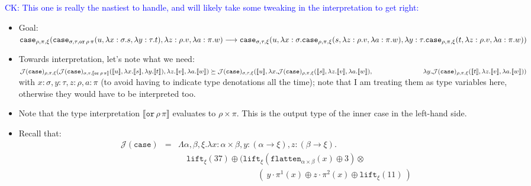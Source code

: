 \documentclass[runningheads,a4paper]{llncs}
\newcommand{\Termmap}{\mathcal{J}}
\newcommand{\typeinterpret}[1]{\llbracket #1 \rrbracket}
\newcommand{\interpret}[1]{\llbracket #1 \rrbracket}
\newcommand{\red}{\longrightarrow}
\newcommand{\arrtype}{\rightarrow}
\newcommand{\abs}[2]{\lambda #1.#2}
\newcommand{\flatten}{\mathtt{flatten}}
\newcommand{\lift}{\mathtt{lift}}
\newcommand{\CK}[1]{\textcolor{blue}{CK: #1}}
\begin{document}
\CK{This one is really the nastiest to handle, and will likely take
some tweaking in the interpretation to get right:}
\begin{itemize}
\item Goal: \\$
\mathtt{case}_{\rho,\pi,\xi}(\mathtt{case}_{\sigma,\tau,\mathtt{or}\,
  \rho\,\pi}(u,\abs{x:\sigma}{s},\abs{y:\tau}{t}),\abs{z:\rho}{v},\abs{a:\pi}{w}) \red \\
  \mathtt{case}_{\sigma,\tau,\xi}(u,
    \abs{x:\sigma}{\mathtt{case}_{\rho,\pi,\xi}(s,\abs{z:\rho}{v},\abs{a:\pi}{w})},
    \abs{y:\tau}{\mathtt{case}_{\rho,\pi,\xi}(t,\abs{z:\rho}{v},\abs{a:\pi}{w})})
$
\item Towards interpretation, let's note what we need: \\
  $\mathcal{J}(\mathtt{case})_{\rho,\pi,\xi}(
    \mathcal{J}(\mathtt{case})_{\sigma,\tau,\typeinterpret{\mathtt{or}\,
    \rho\,\pi}}(\interpret{u},\abs{x}{\interpret{s}},
    \abs{y}{\interpret{t}}),\abs{z}{\interpret{v}},
    \abs{a}{\interpret{w}}) \succeq \\
  \mathcal{J}(\mathtt{case})_{\sigma,\tau,\xi}(\interpret{u},
    \abs{x}{\mathcal{J}(\mathtt{case})_{\rho,\pi,\xi}(\interpret{s},
    \abs{z}{\interpret{v}},\abs{a}{\interpret{w}})},\\
    \phantom{ABCDEFGHIJ}
    \abs{y}{\mathcal{J}(\mathtt{case})_{\rho,\pi,\xi}(\interpret{t},
    \abs{z}{\interpret{v}},\abs{a}{\interpret{w}})})
$ \\
  with $x : \sigma,y:\tau,z:\rho,a:\pi$ (to avoid having to indicate
  type denotations all the time); note that I am treating them as type
  variables here, otherwise they would have to be interpreted too.
\item Note that the type interpretation $\typeinterpret{\mathtt{or}\,
  \rho\,\pi}$ evaluates to $\rho \times \pi$.  This is the output type
  of the inner case in the left-hand side.
\item Recall that:
\[
\begin{array}{rcl}
\Termmap(\mathtt{case}) & = & \Lambda \alpha,\beta,\xi . \lambda x : \alpha \times \beta,
  y : (\alpha \arrtype \xi), z : (\beta \arrtype \xi). \\
  & & \quad
  \lift_\xi(37) \oplus (\lift_\xi(\flatten_{\alpha\times\beta}(x)\oplus 3)
    \otimes \\
  & & \quad\phantom{ABCDEFGHIJKL}
    (\ y \cdot \pi^1(x) \oplus z \cdot \pi^2(x) \oplus
    \lift_\xi(11)\ ) \\
\end{array}
\]
\end{itemize}
\end{document}
